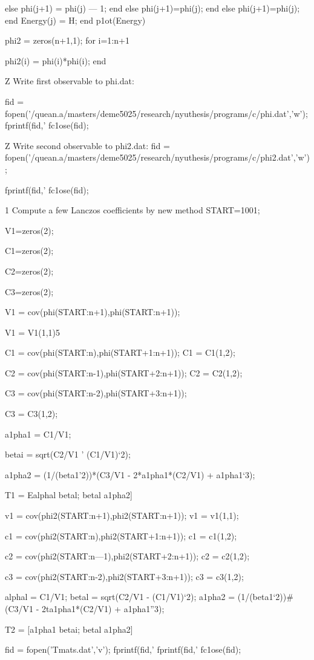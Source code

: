 else
phi(j+1) = phi(j) — 1;
end
else phi(j+1)=phi(j);
end
else phi(j+1)=phi(j);
end
Energy(j) = H;
end
p1ot(Energy)

phi2 = zeros(n+1,1);
for i=1:n+1

phi2(i) = phi(i)*phi(i);
end

Z Write first observable to phi.dat:

fid = fopen(’/quean.a/masters/deme5025/research/nyuthesis/programs/c/phi.dat’,’w’);
fprintf(fid,’%
fc1ose(fid);

Z Write second observable to phi2.dat:
fid = fopen(’/quean.a/masters/deme5025/research/nyuthesis/programs/c/phi2.dat’,’w’);

fprintf(fid,’%
fc1ose(fid);

1 Compute a few Lanczos coefficients by new method
START=1001;

V1=zeros(2);

C1=zeros(2);

C2=zeros(2);

C3=zeros(2);

V1 = cov(phi(START:n+1),phi(START:n+1));

V1 = V1(1,1)5

C1 = cov(phi(START:n),phi(START+1:n+1));
C1 = C1(1,2);

C2 = cov(phi(START:n-1),phi(START+2:n+1));
C2 = C2(1,2);

C3 = cov(phi(START:n-2),phi(START+3:n+1));

C3 = C3(1,2);

a1pha1 = C1/V1;

betai = sqrt(C2/V1 ' (C1/V1)‘2);

a1pha2 = (1/(beta1’2))*(C3/V1 - 2*a1pha1*(C2/V1) + a1pha1‘3);

T1 = Ealphal betal; betal a1pha2]

v1 = cov(phi2(START:n+1),phi2(START:n+1));
v1 = v1(1,1);

c1 = cov(phi2(START:n),phi2(START+1:n+1));
c1 = c1(1,2);

c2 = cov(phi2(START:n—1),phi2(START+2:n+1));
c2 = c2(1,2);

c3 = cov(phi2(START:n-2),phi2(START+3:n+1));
c3 = c3(1,2);

alphal = C1/V1;
betal = sqrt(C2/V1 - (C1/V1)‘2);
a1pha2 = (1/(beta1‘2))#(C3/V1 - 2ta1pha1*(C2/V1) + a1pha1”3);

T2 = [a1pha1 betai; betal a1pha2]

fid = fopen(’Tmats.dat’,’v’);
fprintf(fid,’%
fprintf(fid,’%
fc1ose(fid);

